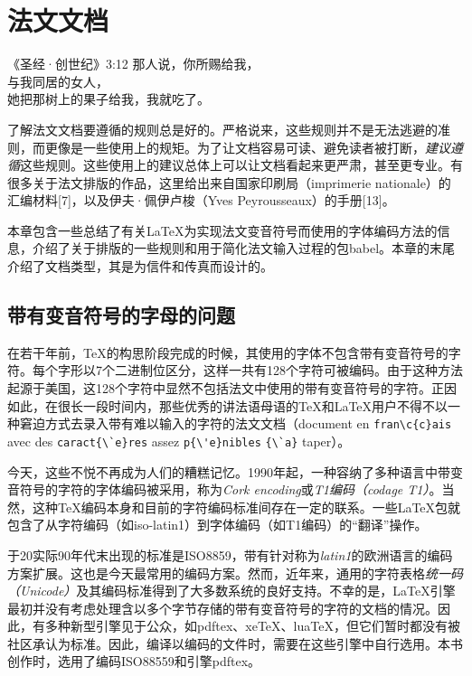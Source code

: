\chapter{法文文档}

\begin{epigraphe}{《圣经·创世纪》3:12}
    那人说，你所赐给我，\\与我同居的女人，\\她把那树上的果子给我，我就吃了。
\end{epigraphe}

了解法文文档要遵循的规则总是好的。严格说来，这些规则并不是无法逃避的准则，而更像是一些使用上的规矩。为了让文档容易可读、避免读者被打断，\emph{建议遵循}这些规则。这些使用上的建议总体上可以让文档看起来更严肃，甚至更专业。有很多关于法文排版的作品，这里给出来自国家印刷局（imprimerie nationale）的汇编材料[7]，以及伊夫·佩伊卢梭（Yves Peyrousseaux）的手册[13]。

本章包含一些总结了有关\LaTeX 为实现法文变音符号而使用的字体编码方法的信息，介绍了关于排版的一些规则和用于简化法文输入过程的包\textsf{babel}。本章的末尾介绍了文档类型，其是为信件和传真而设计的。

\section{带有变音符号的字母的问题}

在若干年前，\TeX 的构思阶段完成的时候，其使用的字体不包含带有变音符号的字符。每个字形以7个二进制位区分，这样一共有128个字符可被编码。由于这种方法起源于美国，这128个字符中显然不包括法文中使用的带有变音符号的字符。正因如此，在很长一段时间内，那些优秀的讲法语母语的\TeX 和\LaTeX 用户不得不以一种窘迫方式去录入带有难以输入的字符的法文文档（document en \verb+fran\c{c}ais+ avec des \verb+caract{\`e}res+ assez \verb+p{\'e}nibles+ \verb+{\`a}+ taper）。

今天，这些不悦不再成为人们的糟糕记忆。1990年起，一种容纳了多种语言中带变音符号的字符的字体编码被采用，称为\emph{Cork encoding}或\emph{T1编码（codage T1）}。当然，这种\TeX 编码本身和目前的字符编码标准间存在一定的联系。一些\LaTeX 包就包含了从字符编码（如iso-latin1）到字体编码（如T1编码）的“翻译”操作。

\begin{exclamation}
    于20实际90年代末出现的标准是ISO8859，带有针对称为\emph{latin1}的欧洲语言的编码方案扩展。这也是今天最常用的编码方案。然而，近年来，通用的字符表格\emph{统一码（Unicode）}及其编码标准得到了大多数系统的良好支持。不幸的是，\LaTeX 引擎最初并没有考虑处理含以多个字节存储的带有变音符号的字符的文档的情况。因此，有多种新型引擎见于公众，如pdftex、xe\TeX 、lua\TeX ，但它们暂时都没有被社区承认为标准。因此，编译以编码的文件时，需要在这些引擎中自行选用。本书创作时，选用了编码ISO88559和引擎pdftex。
\end{exclamation}

